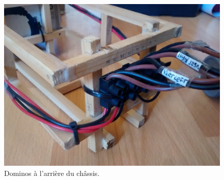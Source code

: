 \documentclass[11pt,a4paper]{article}
\begin{document}
        \begin{figure}[H]
          \centering
          \includegraphics[scale=0.15]{ROVReelDominos.jpg}
          \caption{Dominos à l'arrière du châssis.}
          \label{figDominos}
        \end{figure}
        
\end{document}

